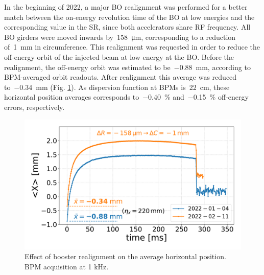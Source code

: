 \documentclass[a4paper,
               keeplastbox,   %
               ]{jacow}
\begin{document}
In the beginning of 2022, a major BO realignment was performed for a better match between the on-energy revolution time of the BO at low energies and the corresponding value in the SR, since both accelerators share RF frequency. All BO girders were moved inwards by~\SI{158}{\micro\meter}, corresponding to a reduction of~\SI{1}{\milli\meter} in circumference. This realignment was requested in order to reduce the off-energy orbit of the injected beam at low energy at the BO. Before the realignment, the off-energy orbit was estimated to be~\SI{-0.88}{\milli\meter}, according to BPM-averaged orbit readouts. After realignment this average was reduced to~\SI{-0.34}{\milli\meter} (Fig. \ref{fig:bo-offenergy}). As dispersion function at BPMs is~\SI{22}{\centi\meter}, these horizontal position averages corresponds to~\SI{-0.40}{\percent} and~\SI{-0.15}{\percent} off-energy errors, respectively.
\begin{figure}[!htb]
   \centering
   \includegraphics*[width=.9\columnwidth]{THPOPT038_f1.pdf}
   \caption{Effect of booster realignment on the average horizontal position. BPM acquisition at 1 kHz.}
   \label{fig:bo-offenergy}
\end{figure}
\end{document}
